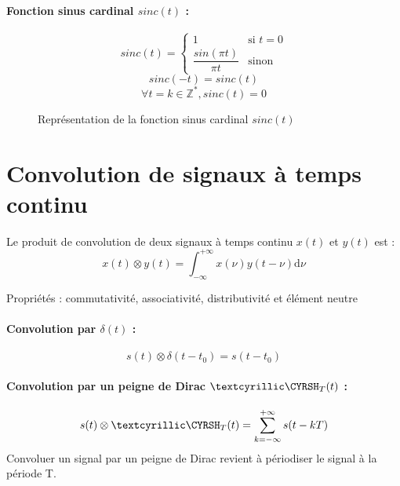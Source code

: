 \documentclass[a4paper,12pt]{article}
\begin{document}
\paragraph{Fonction sinus cardinal $sinc(t)$ :}

\[ sinc(t) =
\begin{cases}
    1 & \text{si } t = 0 \\
    \dfrac{sin(\pi t)}{\pi t} & \text{sinon}
\end{cases} \]
\[ sinc(-t) = sinc(t) \]
\[ \forall t = k \in \mathbb{Z}^{*}, sinc(t) = 0 \]

\begin{figure}[!htbp]
	\centering
	\caption{Représentation de la fonction sinus cardinal $sinc(t)$}
\end{figure}

\section{Convolution de signaux à temps continu}

Le produit de convolution de deux signaux à temps continu $x(t)$ et $y(t)$ est :
\[ x(t) \otimes y(t) = \int_{-\infty}^{+\infty} x(\nu)y(t-\nu) \mathrm{d}\nu \]

Propriétés : commutativité, associativité, distributivité et élément neutre

\paragraph{Convolution par $\delta(t)$ :}
\[ s(t) \otimes \delta(t-t_{0}) = s(t-t_{0}) \]

\paragraph{Convolution par un peigne de Dirac $\dirac_{T}(t)$ :}
\[ s(t) \otimes \dirac_{T}(t) = \sum_{k=-\infty}^{+\infty} s(t-kT) \]
Convoluer un signal par un peigne de Dirac revient à périodiser le signal à la période T.
\end{document}
